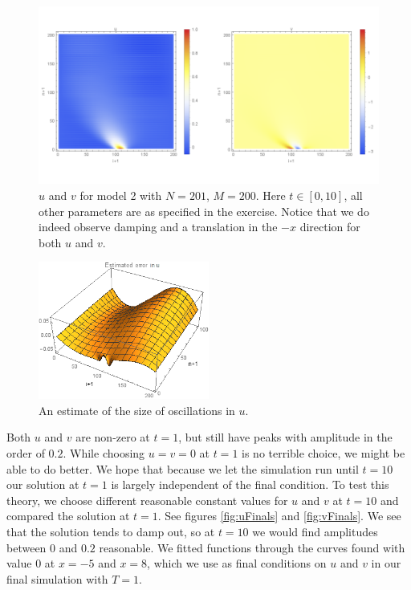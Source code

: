 \documentclass{article}
\renewcommand{\(}{\left(}
\renewcommand{\)}{\right)}
\begin{document}
\begin{figure}
\centering
\includegraphics[width=1.1\textwidth]{uvdamping.png}
\caption{$u$ and $v$ for model 2 with $N=201$, $M=200$. Here $t\in[0,10]$, all other parameters are as specified in the exercise. Notice that we do indeed observe damping and a translation in the $-x$ direction for both $u$ and $v$.}
\label{fig:uvdamp}
\end{figure}

\begin{figure}
\centering
\includegraphics[width=0.5\textwidth]{oscsize.png}
\caption{An estimate of the size of oscillations in $u$.}
\label{fig:oscsize}
\end{figure}

Both $u$ and $v$ are non-zero at $t=1$, but still have peaks with amplitude in the order of $0.2$. While choosing $u = v = 0$ at $t=1$ is no terrible choice, we might be able to do better. We hope that because we let the simulation run until $t=10$ our solution at $t=1$ is largely independent of the final condition. To test this theory, we choose different reasonable constant values for $u$ and $v$ at $t=10$ and compared the solution at $t=1$. See figures \ref{fig:uFinals} and \ref{fig:vFinals}. We see that the solution tends to damp out, so at $t=10$ we would find amplitudes between $0$ and $0.2$ reasonable. We fitted functions through the curves found with value $0$ at $x=-5$ and $x=8$, which we use as final conditions on $u$ and $v$ in our final simulation with $T=1$.
\end{document}
